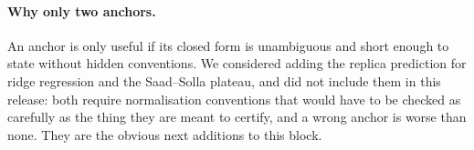 \paragraph{Why only two anchors.}
An anchor is only useful if its closed form is unambiguous and short enough to
state without hidden conventions. We considered adding the replica prediction
for ridge regression and the Saad--Solla plateau, and did not include them in
this release: both require normalisation conventions that would have to be
checked as carefully as the thing they are meant to certify, and a wrong anchor
is worse than none. They are the obvious next additions to this block.
